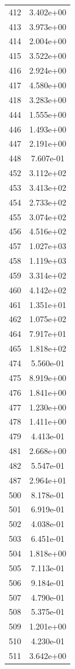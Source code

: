 \documentclass[12pt]{article}
\begin{document}
\begin{longtable}{@{}cc@{}}
412 & 3.402e+00 \\
413 & 3.973e+00 \\
414 & 2.004e+00 \\
415 & 3.522e+00 \\
416 & 2.924e+00 \\
417 & 4.580e+00 \\
418 & 3.283e+00 \\
444 & 1.555e+00 \\
446 & 1.493e+00 \\
447 & 2.191e+00 \\
448 & 7.607e-01 \\
452 & 3.112e+02 \\
453 & 3.413e+02 \\
454 & 2.733e+02 \\
455 & 3.074e+02 \\
456 & 4.516e+02 \\
457 & 1.027e+03 \\
458 & 1.119e+03 \\
459 & 3.314e+02 \\
460 & 4.142e+02 \\
461 & 1.351e+01 \\
462 & 1.075e+02 \\
464 & 7.917e+01 \\
465 & 1.818e+02 \\
474 & 5.560e-01 \\
475 & 8.919e+00 \\
476 & 1.841e+00 \\
477 & 1.230e+00 \\
478 & 1.411e+00 \\
479 & 4.413e-01 \\
481 & 2.668e+00 \\
482 & 5.547e-01 \\
487 & 2.964e+01 \\
500 & 8.178e-01 \\
501 & 6.919e-01 \\
502 & 4.038e-01 \\
503 & 6.451e-01 \\
504 & 1.818e+00 \\
505 & 7.113e-01 \\
506 & 9.184e-01 \\
507 & 4.790e-01 \\
508 & 5.375e-01 \\
509 & 1.201e+00 \\
510 & 4.230e-01 \\
511 & 3.642e+00 \\

\end{longtable}
\end{document}
